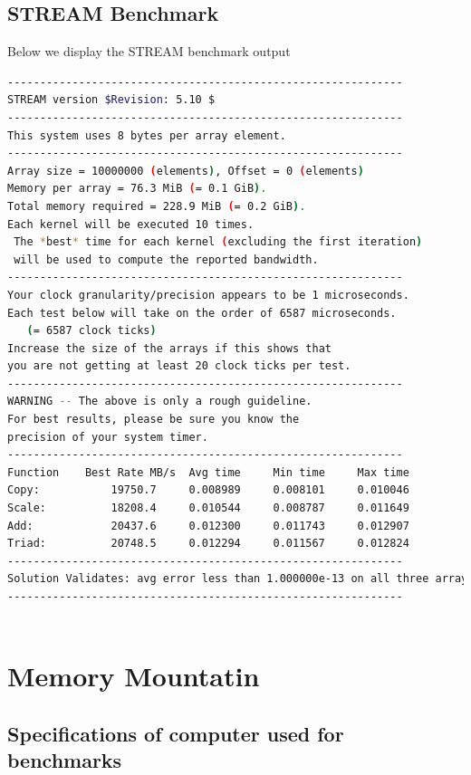 \documentclass[a4paper, 11pt]{article}
\begin{document}
\subsection{STREAM Benchmark}
Below we display the STREAM benchmark output
\begin{lstlisting}[language=bash]
-------------------------------------------------------------
STREAM version $Revision: 5.10 $
-------------------------------------------------------------
This system uses 8 bytes per array element.
-------------------------------------------------------------
Array size = 10000000 (elements), Offset = 0 (elements)
Memory per array = 76.3 MiB (= 0.1 GiB).
Total memory required = 228.9 MiB (= 0.2 GiB).
Each kernel will be executed 10 times.
 The *best* time for each kernel (excluding the first iteration)
 will be used to compute the reported bandwidth.
-------------------------------------------------------------
Your clock granularity/precision appears to be 1 microseconds.
Each test below will take on the order of 6587 microseconds.
   (= 6587 clock ticks)
Increase the size of the arrays if this shows that
you are not getting at least 20 clock ticks per test.
-------------------------------------------------------------
WARNING -- The above is only a rough guideline.
For best results, please be sure you know the
precision of your system timer.
-------------------------------------------------------------
Function    Best Rate MB/s  Avg time     Min time     Max time
Copy:           19750.7     0.008989     0.008101     0.010046
Scale:          18208.4     0.010544     0.008787     0.011649
Add:            20437.6     0.012300     0.011743     0.012907
Triad:          20748.5     0.012294     0.011567     0.012824
-------------------------------------------------------------
Solution Validates: avg error less than 1.000000e-13 on all three arrays
-------------------------------------------------------------
 
\end{lstlisting}


\section{Memory Mountatin}
\subsection{Specifications of computer used for benchmarks}
\end{document}
